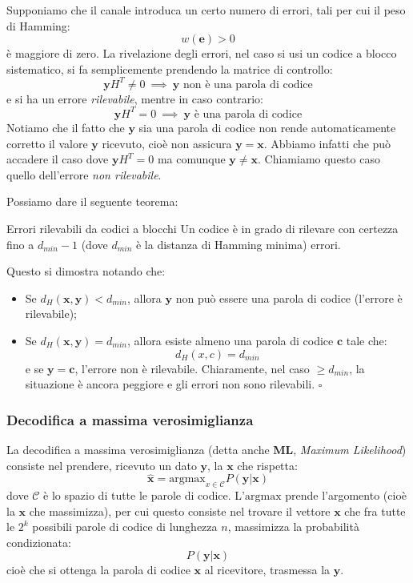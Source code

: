 \documentclass[a4paper,11pt]{article}
\begin{document}
Supponiamo che il canale introduca un certo numero di errori, tali per cui il peso di Hamming:
$$
w(\mathbf{e}) > 0
$$
è maggiore di zero. La rivelazione degli errori, nel caso si usi un codice a blocco sistematico, si fa semplicemente prendendo la matrice di controllo:
$$
\mathbf{y} H^T \neq 0 \ \implies \ \text{$\mathbf{y}$ non è una parola di codice} 
$$
e si ha un errore \textit{rilevabile}, mentre in caso contrario:
$$
\mathbf{y} H^T = 0 \ \implies \ \text{$\mathbf{y}$ è una parola di codice} 
$$
Notiamo che il fatto che $\mathbf{y}$ sia una parola di codice non rende automaticamente corretto il valore $\mathbf{y}$ ricevuto, cioè non assicura $\mathbf{y} = \mathbf{x}$.
Abbiamo infatti che può accadere il caso dove $\mathbf{y} H^T = 0$ ma comunque $\mathbf{y} \neq \mathbf{x}$. Chiamiamo questo caso quello dell'errore \textit{non rilevabile}.

Possiamo dare il seguente teorema:
\begin{theorem}{Errori rilevabili da codici a blocchi}
	Un codice è in grado di rilevare con certezza fino a $d_{min} - 1$ (dove $d_{min}$ è la distanza di Hamming minima) errori.
\end{theorem}

Questo si dimostra notando che:
\begin{itemize}
	\item Se $d_H(\mathbf{x}, \mathbf{y}) < d_{min}$, allora $\mathbf{y}$ non può essere una parola di codice (l'errore è rilevabile);
	\item Se $d_H(\mathbf{x}, \mathbf{y}) = d_{min}$, allora esiste almeno una parola di codice $\mathbf{c}$ tale che:
$$
d_H(x, c) = d_{min}
$$
e se $\mathbf{y} = \mathbf{c}$, l'errore non è rilevabile. Chiaramente, nel caso $\geq d_{min}$, la situazione è ancora peggiore e gli errori non sono rilevabili. \hfill $\square$
\end{itemize}

\subsubsection{Decodifica a massima verosimiglianza}
La decodifica a massima verosimiglianza (detta anche \textbf{ML}, \textit{Maximum Likelihood}) consiste nel prendere, ricevuto un dato $\mathbf{y}$, la $\mathbf{x}$ che rispetta:
$$
\hat{\mathbf{x}} = \mathrm{argmax}_{x \in \mathcal{C}} P(\mathbf{y} | \mathbf{x})
$$
dove $\mathcal{C}$ è lo spazio di tutte le parole di codice. L'$\mathrm{argmax}$ prende l'argomento (cioè la $\mathbf{x}$ che massimizza), per cui questo consiste nel trovare il vettore $\mathbf{x}$ che fra tutte le $2^k$ possibili parole di codice di lunghezza $n$, massimizza la probabilità condizionata:
$$
P(\mathbf{y} | \mathbf{x})
$$
cioè che si ottenga la parola di codice $\mathbf{x}$ al ricevitore, trasmessa la $\mathbf{y}$.
\end{document}

